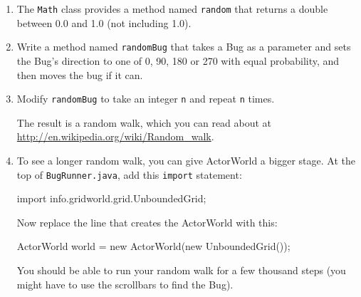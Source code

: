 \begin{exercise}

\begin{enumerate}

\item The {\tt Math} class provides a method named {\tt random}
that returns a double between 0.0 and 1.0 (not including 1.0).

\item Write a method named {\tt randomBug} that takes a Bug as a
  parameter and sets the Bug's direction to one of 0, 90, 180 or 270
  with equal probability, and then moves the bug if it can.

\item Modify {\tt randomBug} to take an integer {\tt n} and repeat
{\tt n} times.

The result is a random walk, which you can read about
at \url{http://en.wikipedia.org/wiki/Random_walk}.

\item To see a longer random walk, you can give ActorWorld a bigger stage.
At the top of {\tt BugRunner.java}, add this {\tt import} statement:

\begin{code}
import info.gridworld.grid.UnboundedGrid;
\end{code}

Now replace the line that creates the ActorWorld with this:

\begin{code}
    ActorWorld world = new ActorWorld(new UnboundedGrid());
\end{code}

You should be able to run your random walk for a few thousand
steps (you might have to use the scrollbars to find the Bug).

\end{enumerate}
\end{exercise}


